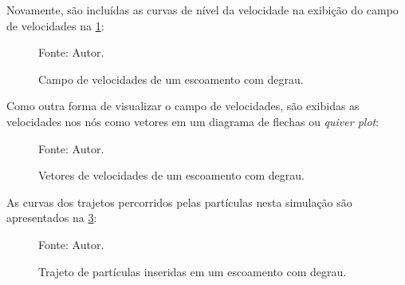 Novamente, são incluídas as curvas de nível da velocidade na exibição do campo de velocidades na \ref{step_result}:
\begin{figure}[H]
    \centering
     {\raggedleft \scriptsize Fonte: Autor.}
    \caption{Campo de velocidades de um escoamento com degrau.}
    \label{step_result}
\end{figure}

Como outra forma de visualizar o campo de velocidades, são exibidas as velocidades nos nós como vetores em um diagrama de flechas ou \textit{quiver plot}:
\begin{figure}[H]
    \centering
     {\raggedleft \scriptsize Fonte: Autor.}
    \caption{Vetores de velocidades de um escoamento com degrau.}
    \label{step_velocity}
\end{figure}

As curvas dos trajetos percorridos pelas partículas nesta simulação são apresentados na \ref{step_trajectory}:
\begin{figure}[H]
    \centering
     {\raggedleft \scriptsize Fonte: Autor.}
    \caption{Trajeto de partículas inseridas em um escoamento com degrau.}
    \label{step_trajectory}
\end{figure}

